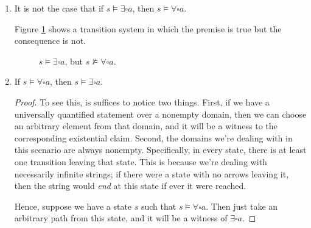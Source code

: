 \documentclass[letterpaper,11pt]{article}
\newcommand{\always}{\square}
\newcommand{\nmodels}{\nvDash}
\begin{document}
\begin{enumerate}
    \item It is not the case that
        if $s \models \exists \always a$, then $s \models \forall \always a$.

        Figure \ref{fig:ts-counterexample-2} shows a transition system in which
        the premise is true but the consequence is not.

        \begin{figure}[ht]
            \centering
            \caption{
                $s \models \exists \always a$, but
                $s \nmodels \forall \always a$.
            }
            \label{fig:ts-counterexample-2}
        \end{figure}

    \item If $s \models \forall \always a$, then $s \models \exists \always a$.

        \begin{proof}
            To see this, is suffices to notice two things.
            First, if we have a universally quantified statement over a
            nonempty domain, then we can choose an arbitrary element from that
            domain, and it will be a witness to the corresponding existential
            claim.
            Second, the domains we're dealing with in this scenario are always
            nonempty. Specifically, in every state, there is at least one
            transition leaving that state. This is because we're dealing with
            necessarily infinite strings; if there were a state with no arrows
            leaving it, then the string would \emph{end} at this state if ever
            it were reached.

            Hence, suppose we have a state $s$ such that
            $s \models \forall \always a$. Then just take an arbitrary path
            from this state, and it will be a witness of $\exists \always a$.
        \end{proof}
\end{enumerate}
\end{document}
